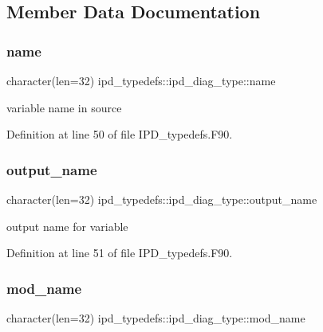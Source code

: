 \subsection{Member Data Documentation}
\mbox{\label{structipd__typedefs_1_1ipd__diag__type_a25d840581c4a25b724cfbb2f0c4d9070}} 
\subsubsection{name}
{\footnotesize\ttfamily character(len=32) ipd\+\_\+typedefs\+::ipd\+\_\+diag\+\_\+type\+::name}



variable name in source 



Definition at line 50 of file I\+P\+D\+\_\+typedefs.\+F90.

\mbox{\label{structipd__typedefs_1_1ipd__diag__type_a5b29d1f5218313602b1fa780b8c34cd4}} 
\subsubsection{output\+\_\+name}
{\footnotesize\ttfamily character(len=32) ipd\+\_\+typedefs\+::ipd\+\_\+diag\+\_\+type\+::output\+\_\+name}



output name for variable 



Definition at line 51 of file I\+P\+D\+\_\+typedefs.\+F90.

\mbox{\label{structipd__typedefs_1_1ipd__diag__type_a63f48a09956929e7a4e5e46238207496}} 
\subsubsection{mod\+\_\+name}
{\footnotesize\ttfamily character(len=32) ipd\+\_\+typedefs\+::ipd\+\_\+diag\+\_\+type\+::mod\+\_\+name}




